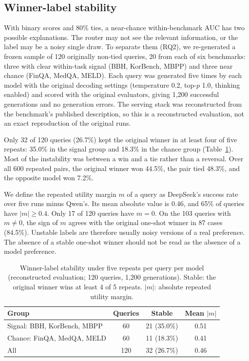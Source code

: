 \documentclass[lettersize,journal]{IEEEtran}
\begin{document}
\subsection{Winner-label stability}
\label{sec:a-stability}
With binary scores and 80\% ties, a near-chance within-benchmark AUC has two possible explanations. The router may not see the relevant information, or the label may be a noisy single draw. To separate them (RQ2), we re-generated a frozen sample of 120 originally non-tied queries, 20 from each of six benchmarks: three with clear within-task signal (BBH, KorBench, MBPP) and three near chance (FinQA, MedQA, MELD). Each query was generated five times by each model with the original decoding settings (temperature 0.2, top-$p$ 1.0, thinking enabled) and scored with the original evaluators, giving 1,200 successful generations and no generation errors. The serving stack was reconstructed from the benchmark's published description, so this is a reconstructed evaluation, not an exact reproduction of the original runs.

Only 32 of 120 queries (26.7\%) kept the original winner in at least four of five repeats: 35.0\% in the signal group and 18.3\% in the chance group (Table~\ref{tab:stability}). Most of the instability was between a win and a tie rather than a reversal. Over all 600 repeated pairs, the original winner won 44.5\%, the pair tied 48.3\%, and the opposite model won 7.2\%.

We define the repeated utility margin $m$ of a query as DeepSeek's success rate over five runs minus Qwen's. Its mean absolute value is 0.46, and 65\% of queries have $|m|\geq0.4$. Only 17 of 120 queries have $m=0$. On the 103 queries with $m\neq0$, the sign of $m$ agrees with the original one-shot winner in 87 cases (84.5\%). Unstable labels are therefore usually noisy versions of a real preference. The absence of a stable one-shot winner should not be read as the absence of a model preference.

\begin{table}[t]
\centering
\caption{Winner-label stability under five repeats per query per model (reconstructed evaluation; 120 queries, 1,200 generations). Stable: the original winner wins at least 4 of 5 repeats. $|m|$: absolute repeated utility margin.}
\label{tab:stability}
\footnotesize
\setlength{\tabcolsep}{3pt}
\begin{tabular}{@{}lccc@{}}
\toprule
Group & Queries & Stable & Mean $|m|$ \\
\midrule
Signal: BBH, KorBench, MBPP & 60 & 21 (35.0\%) & 0.51 \\
Chance: FinQA, MedQA, MELD & 60 & 11 (18.3\%) & 0.41 \\
All & 120 & 32 (26.7\%) & 0.46 \\
\bottomrule
\end{tabular}
\end{table}
\end{document}
